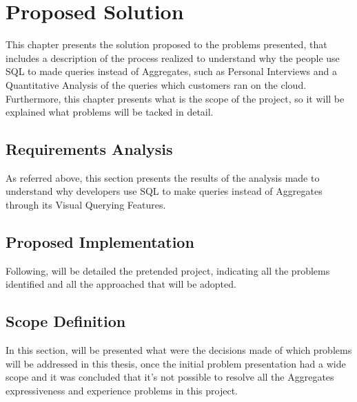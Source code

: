 \chapter{Proposed Solution}
\label{cha:proposed_solution}
This chapter presents the solution proposed to the problems presented, that 
includes a description of the process realized to understand why the people 
use SQL to made queries instead of Aggregates, such as Personal Interviews and 
a Quantitative Analysis of the queries which customers ran on the cloud. 
Furthermore, this chapter presents what is the scope of the project, so it will 
be explained what problems will be tacked in detail.

\section{Requirements Analysis}
\label{sec:requirements_analysis}
As referred above, this section presents the results of the analysis made to 
understand why developers use SQL to make queries instead of Aggregates through 
its Visual Querying Features.

\section{Proposed Implementation}
\label{sec:proposed_implementation}
Following, will be detailed the pretended project, indicating all the problems 
identified and all the approached that will be adopted.

\section{Scope Definition}
\label{sec:scope_definition}
In this section, will be presented what were the decisions made of which problems 
will be addressed in this thesis, once the initial problem presentation had a wide 
scope and it was concluded that it's not possible to resolve all the Aggregates 
expressiveness and experience problems in this project.